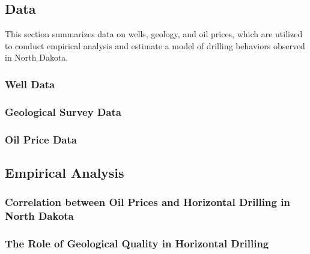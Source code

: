 \subsection{Data}
\label{C3-SubSection:Data}
This section summarizes data on wells, geology, and oil prices, which are utilized to conduct empirical analysis and estimate a model of drilling behaviors observed in North Dakota. 

\subsubsection{Well Data}
\label{C3-SubSubSection:Well-Data}


\subsubsection{Geological Survey Data}
\label{C3-SubSubSection:Geological-Survey-Data}


\subsubsection{Oil Price Data}
\label{C3_SubSubSection:Oil-Price-Data}



\subsection{Empirical Analysis}
\label{C3-SubSection:Empirical-Analysis}

\subsubsection{Correlation between Oil Prices and Horizontal Drilling in North Dakota}
\label{C3-SubSubSection:Correlation-between-Oil-Prices-and-Horizontal-Drilling-in-ND}


\subsubsection{The Role of Geological Quality in Horizontal Drilling}
\label{C3-SubSubSection:The-Role-of-Geological-Quality-in-Horizontal-Drilling}



